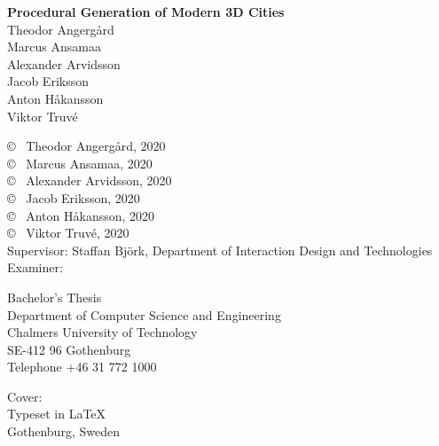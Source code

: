 \newpage
\thispagestyle{empty}
\vspace*{4.5cm}
\textbf{Procedural Generation of Modern 3D Cities} \\
Theodor Angergård \\
Marcus Ansamaa \\
Alexander Arvidsson \\
Jacob Eriksson \\
Anton Håkansson \\
Viktor Truvé \\
\setlength{\parskip}{1cm}

\copyright ~ Theodor Angergård, 2020 \\
\copyright ~ Marcus Ansamaa, 2020 \\
\copyright ~ Alexander Arvidsson, 2020 \\
\copyright ~ Jacob Eriksson, 2020 \\
\copyright ~ Anton Håkansson, 2020 \\
\copyright ~ Viktor Truvé, 2020 \\

Supervisor: Staffan Björk, Department of Interaction Design and Technologies \\
Examiner:  \setlength{\parskip}{1cm}

Bachelor's Thesis \the\year\\	%
Department of Computer Science and Engineering\\
Chalmers University of Technology\\
SE-412 96 Gothenburg\\
Telephone +46 31 772 1000 \setlength{\parskip}{0.5cm}

\vfill
Cover:  \setlength{\parskip}{0.5cm} \\
Typeset in \LaTeX \\
Gothenburg, Sweden \the\year